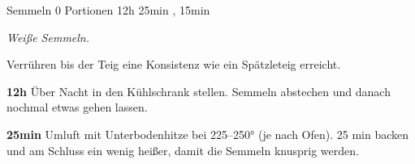 \begin{recipe}{Semmeln} {0 Portionen} {12h 25min , 15min }

  \freeform{}\textit{Weiße Semmeln.}


  Verrühren bis der Teig eine Konsistenz wie ein Spätzleteig erreicht.

  \newstep{}\textbf{12h}
  Über Nacht in den Kühlschrank stellen.
  Semmeln abstechen und danach nochmal etwas gehen lassen.

  \newstep{}\textbf{25min}
  Umluft mit Unterbodenhitze bei 225–250° (je nach Ofen).
  25 min backen und am Schluss ein wenig heißer, damit die Semmeln knusprig werden.

  \freeform{}\hrulefill{}

\end{recipe}
